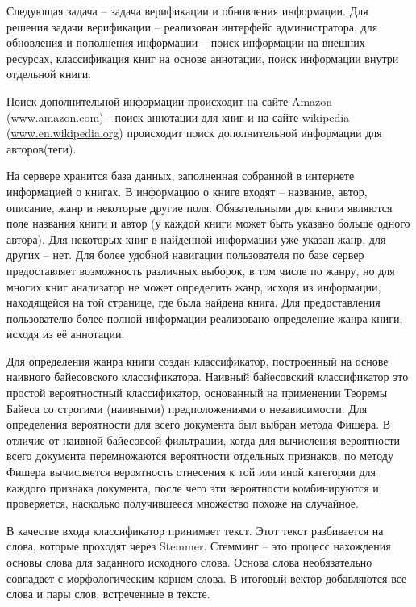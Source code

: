 \documentclass[a4paper]{report}
\begin{document}

Следующая задача -- задача верификации и обновления информации. Для решения задачи верификации -- реализован интерфейс администратора, для обновления и пополнения информации -- поиск информации на внешних ресурсах, классификация книг на основе аннотации, поиск информации внутри отдельной книги.

Поиск дополнительной информации происходит на сайте Amazon (\url {www.amazon.com}) - поиск аннотации для книг и на сайте wikipedia (\url {www.en.wikipedia.org}) происходит поиск дополнительной информации для авторов(теги).


На сервере хранится база данных, заполненная собранной в интернете информацией о книгах. В информацию о книге входят -- название, автор, описание, жанр и некоторые другие поля. Обязательными для книги являются поле названия книги и автор (у каждой книги может быть указано больше одного автора). Для некоторых книг в найденной информации уже указан жанр, для других -- нет. Для более удобной навигации пользователя по базе сервер предоставляет возможность различных выборок, в том числе по жанру, но для многих книг анализатор не может определить жанр, исходя из информации, находящейся на той странице, где была найдена книга. Для предоставления пользователю более полной информации реализовано определение жанра книги, исходя из её аннотации. 

Для определения жанра книги создан классификатор, построенный на основе наивного байесовского классификатора. Наивный байесовский классификатор это простой вероятностный классификатор, основанный на применении Теоремы Байеса со строгими (наивными) предположениями о независимости. Для определения вероятности для всего документа был выбран метода Фишера. 
В отличие от наивной байесовсой фильтрации, когда для вычисления вероятности всего документа перемножаются вероятности отдельных признаков, по методу Фишера вычисляется вероятность отнесения к той или иной категории для каждого признака документа, после чего эти вероятности комбинируются и проверяется, насколько получившееся множество похоже на случайное.

В качестве входа классификатор принимает текст. Этот текст разбивается на слова, которые проходят через Stemmer. Стемминг -- это процесс нахождения основы слова для заданного исходного слова. Основа слова необязательно совпадает с морфологическим корнем слова. В итоговый вектор добавляются все слова и пары слов, встреченные в тексте.
\end{document}
